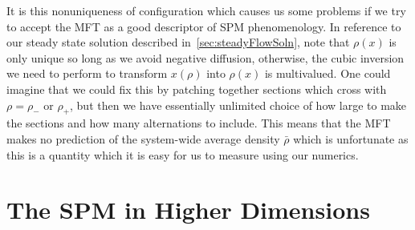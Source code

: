 It is this nonuniqueness of configuration which causes us some problems if we try to accept the MFT as a good descriptor of SPM phenomenology. In reference to our steady state solution described in~\ref{sec:steadyFlowSoln},
note that $\rho(x)$ is only unique so long as we avoid negative diffusion, otherwise, the cubic inversion we need to perform to transform $x(\rho)$ into $\rho(x)$ is multivalued. One could imagine that we could fix this
by patching together sections which cross with $\rho=\rho_-$ or $\rho_+$, but then we have essentially unlimited choice of how large to make the sections and how many alternations to include. This means that the MFT makes no
prediction of the system-wide average density $\bar{\rho}$
which is unfortunate as this is a quantity which it is easy for us to measure using our numerics.


\section{The SPM in Higher Dimensions} \label{sec:highDimSPM}

